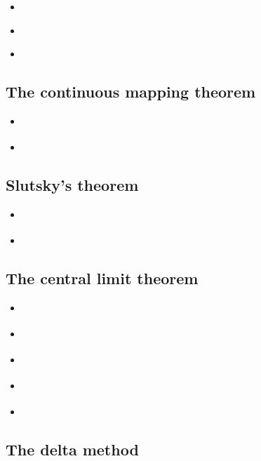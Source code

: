 \documentclass{report}
\begin{document}
\begin{itemize}
    \item \cite[Chapter~2.2]{van_der_vaart_asymptotic_1998}
    \item \cite[Chapter~1.4]{lehmann_elements_1999}
    \item \cite[Chapter~1.1]{serfling_approximation_1980}
\end{itemize}

\subsection{The continuous mapping theorem}

\begin{itemize}
    \item \cite[Chapter~2.1]{van_der_vaart_asymptotic_1998}
    \item \cite[Chapter~1.3]{dasgupta_asymptotic_2008}
\end{itemize}

\subsection{Slutsky's theorem}

\begin{itemize}
    \item \cite[Chapter~2.1]{van_der_vaart_asymptotic_1998}
    \item \cite[Chapter~1.1]{dasgupta_asymptotic_2008}
\end{itemize}

\subsection{The central limit theorem}

\begin{itemize}
    \item \cite[Chapter~2.1]{van_der_vaart_asymptotic_1998}
    \item \cite[Chapter~1.3]{dasgupta_asymptotic_2008}
    \item \cite[Chapter~5.5]{casella_statistical_2002}
    \item \cite[Chapter~2.4]{lehmann_elements_1999}
    \item \cite[Chapter~1.9]{serfling_approximation_1980}
\end{itemize}

\subsection{The delta method}
\end{document}
